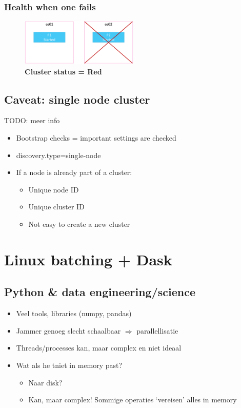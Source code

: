 \documentclass{article}
\begin{document}
\subsubsection{Health when one fails}

\begin{figure}[H]
    \centering
    \includegraphics[width=0.5\textwidth]{change-number-of-replicas-red.png}
    \caption{\textbf{Cluster status = Red}}
\end{figure}

\subsection{Caveat: single node cluster}

TODO: meer info

\begin{itemize}
    \item Bootstrap checks = important settings are checked
    \item discovery.type=single-node
    \item If a node is already part of a cluster:
    \begin{itemize}
        \item Unique node ID
        \item Unique cluster ID
        \item Not easy to create a new cluster
    \end{itemize}
\end{itemize}

\section{Linux batching + Dask}

\subsection{Python \& data engineering/science}

\begin{itemize}
    \item Veel tools, libraries (numpy, pandas)
    \item Jammer genoeg slecht schaalbaar $\Rightarrow$ parallellisatie
    \item Threads/processes kan, maar complex en niet ideaal
    \item Wat als he tniet in memory past?
    \begin{itemize}
        \item Naar disk?
        \item Kan, maar complex! Sommige operaties `vereisen' alles in memory
    \end{itemize}
\end{itemize}
\end{document}
